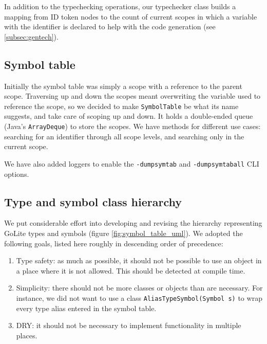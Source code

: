 \documentclass[oneside]{article}
\begin{document}
In addition to the typechecking operations, our typechecker class builds a mapping from ID token nodes to the count of current scopes in which a variable with the identifier is declared to help with the code generation (see \ref{subsec:gentech}).

\subsection{Symbol table}

Initially the symbol table was simply a scope with a reference to the parent scope. Traversing up and down the scopes meant overwriting the variable used to reference the scope, so we decided to make \texttt{SymbolTable} be what its name suggests, and take care of scoping up and down. It holds a double-ended queue (Java's \texttt{ArrayDeque}) to store the scopes. We have methods for different use cases: searching for an identifier through all scope levels, and searching only in the current scope.

We have also added loggers to enable the \verb|-dumpsymtab| and \verb|-dumpsymtaball| CLI options.

\subsection{Type and symbol class hierarchy}

We put considerable effort into developing and revising the hierarchy representing GoLite types and symbols (figure \ref{fig:symbol_table_uml}). We adopted the following goals, listed here roughly in descending order of precedence:

\begin{enumerate}
    \item Type safety: as much as possible, it should not be possible to use an object in a place where it is not allowed. This should be detected at compile time.
    \item Simplicity: there should not be more classes or objects than are necessary. For instance, we did not want to use a class \texttt{AliasTypeSymbol(Symbol s)} to wrap every type alias entered in the symbol table.
    \item DRY: it should not be necessary to implement functionality in multiple places.
\end{enumerate}
\end{document}
